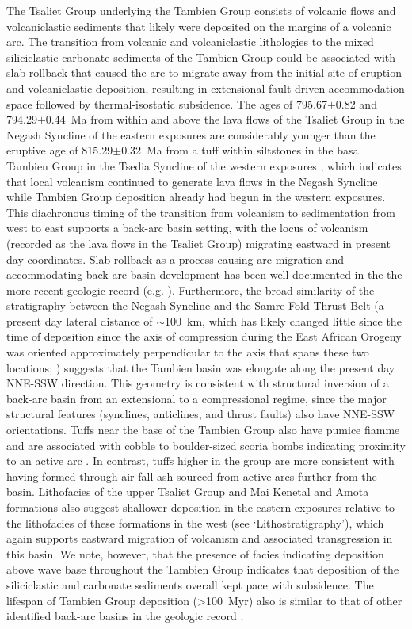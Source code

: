 \documentclass[11pt,letterpaper]{article}
\begin{document}
The Tsaliet Group underlying the Tambien Group consists of volcanic flows and volcaniclastic sediments that likely were deposited on the margins of a volcanic arc. The transition from volcanic and volcaniclastic lithologies to the mixed siliciclastic-carbonate sediments of the Tambien Group could be associated with slab rollback that caused the arc to migrate away from the initial site of eruption and volcaniclastic deposition, resulting in extensional fault-driven accommodation space followed by thermal-isostatic subsidence. The ages of 795.67$\pm$0.82 and 794.29$\pm$0.44~Ma from within and above the lava flows of the Tsaliet Group in the Negash Syncline of the eastern exposures are considerably younger than the eruptive age of 815.29$\pm$0.32~Ma from a tuff within siltstones in the basal Tambien Group in the Tsedia Syncline of the western exposures \citep{Swanson-Hysell2015a}, which indicates that local volcanism continued to generate lava flows in the Negash Syncline while Tambien Group deposition already had begun in the western exposures. This diachronous timing of the transition from volcanism to sedimentation from west to east supports a back-arc basin setting, with the locus of volcanism (recorded as the lava flows in the Tsaliet Group) migrating eastward in present day coordinates. Slab rollback as a process causing arc migration and accommodating back-arc basin development has been well-documented in the the more recent geologic record (e.g. \citealp{Uyeda1979a, Kastens1988a, Schellart2006a}). Furthermore, the broad similarity of the stratigraphy between the Negash Syncline and the Samre Fold-Thrust Belt (a present day lateral distance of $\sim$100~km, which has likely changed little since the time of deposition since the axis of compression during the East African Orogeny was oriented approximately perpendicular to the axis that spans these two locations; \citealp{Stern1994a}) suggests that the Tambien basin was elongate along the present day NNE-SSW direction. This geometry is consistent with structural inversion of a back-arc basin from an extensional to a compressional regime, since the major structural features (synclines, anticlines, and thrust faults) also have NNE-SSW orientations. Tuffs near the base of the Tambien Group also have pumice fiamme and are associated with cobble to boulder-sized scoria bombs indicating proximity to an active arc \citep{Swanson-Hysell2015a}. In contrast, tuffs higher in the group are more consistent with having formed through air-fall ash sourced from active arcs further from the basin. Lithofacies of the upper Tsaliet Group and Mai Kenetal and Amota formations also suggest shallower deposition in the eastern exposures relative to the lithofacies of these formations in the west (see `Lithostratigraphy'), which again supports eastward migration of volcanism and associated transgression in this basin. We note, however, that the presence of facies indicating deposition above wave base throughout the Tambien Group indicates that deposition of the siliciclastic and carbonate sediments overall kept pace with subsidence. The lifespan of Tambien Group deposition (\textgreater100~Myr) also is similar to that of other identified back-arc basins in the geologic record \citep{Woodcock2004a}.
\end{document}
